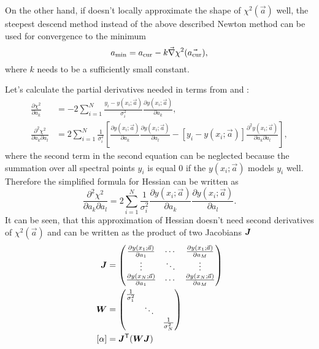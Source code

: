 On the other hand, if
doesn't locally approximate the shape of $\chi^2(\vec{a})$ well, the steepest
descend method instead of the above described Newton method can be used for
convergence to the minimum
\begin{equation}
	a_\text{min} = a_\text{cur} - k\vec{\nabla}\chi^2(\vec{a_\text{cur}}),
	\label{\eqnlabel{minimization:gradient_min}}
\end{equation}
where $k$ needs to be a sufficiently small constant.

Let's calculate the partial derivatives needed in terms from
 and :
\begin{align*}
	\frac{\partial\chi^2}{\partial{}a_k} &= -2\sum_{i=1}^N{
		\frac{y_i - y(x_i;\vec{a})}{\sigma_i^2}
		\frac{\partial{}y(x_i;\vec{a})}{\partial{}a_k}
	},\\
	\frac{\partial^2\chi^2}{\partial{}a_k\partial{}a_l} &= 2\sum_{i=1}^N{
		\frac{1}{\sigma_i^2}\left[
			\frac{\partial{}y(x_i;\vec{a})}{\partial{}a_k}
			\frac{\partial{}y(x_i;\vec{a})}{\partial{}a_l}
			- [y_i - y(x_i;\vec{a})]
				\frac{\partial^2{}y(x_i;\vec{a})}{\partial{}a_k\partial{}a_l}
		\right]
	},
\end{align*}
where the second term in the second equation can be neglected because the
summation over all spectral points $y_i$ is equal 0 if the
$y(x_i;\vec{a})$ models $y_i$ well. Therefore the simplified formula for
Hessian can be written as
\begin{equation*}
	\frac{\partial^2\chi^2}{\partial{}a_k\partial{}a_l} = 2\sum_{i=1}^N{
		\frac{1}{\sigma_i^2}
		\frac{\partial{}y(x_i;\vec{a})}{\partial{}a_k}
		\frac{\partial{}y(x_i;\vec{a})}{\partial{}a_l}
	}.
\end{equation*}
It can be seen, that this approximation of Hessian doesn't need second
derivatives of $\chi^2(\vec{a})$ and can be written as the product of two
Jacobians $\bm{J}$
\begin{align*}
	\bm{J} &=
		\begin{pmatrix}
			\frac{\partial{}y(x_1;\vec{a})}{\partial{}a_1} & \cdots & \frac{\partial{}y(x_1;\vec{a})}{\partial{}a_M} \\
			\vdots                                         & \ddots & \vdots \\
			\frac{\partial{}y(x_N;\vec{a})}{\partial{}a_1} & \cdots & \frac{\partial{}y(x_N;\vec{a})}{\partial{}a_M}
		\end{pmatrix}\\
	\bm{W} &=
		\begin{pmatrix}
			\frac{1}{\sigma_1^2} \\
			& \ddots \\
			&& \frac{1}{\sigma_N^2}
		\end{pmatrix}\\
	[\alpha] &= \bm{J}^\mathsf{T}(\bm{W}\bm{J})
\end{align*}

